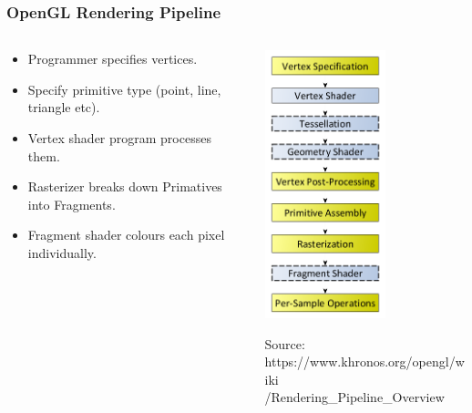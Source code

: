 \documentclass{beamer}
\begin{document}
\begin{frame}
\frametitle{OpenGL Rendering Pipeline}
\begin{columns}
    \begin{column}{0.5\textwidth}
      \begin{itemize}
        \item Programmer specifies vertices.
        \item Specify primitive type (point, line, triangle etc).
        \item Vertex shader program processes them.
        \item Rasterizer breaks down Primatives into Fragments.
        \item Fragment shader colours each pixel individually.
      \end{itemize}
    \end{column}
    \begin{column}{0.5\textwidth}
      \centering
      \includegraphics[width=0.6\textwidth]{RenderingPipeline.png}
      \par \tiny {Source: https://www.khronos.org/opengl/wiki\\/Rendering\_Pipeline\_Overview}
    \end{column}
  \end{columns}
\end{frame}
\end{document}
